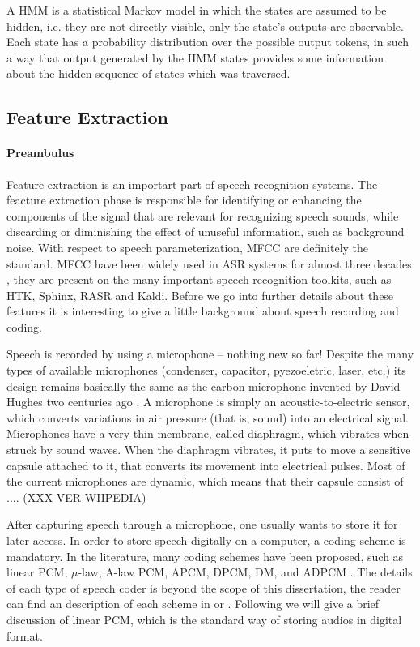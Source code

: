 A \ac{HMM} is a statistical Markov model in which the states are assumed to be hidden, i.e. they are
not directly visible, only the state's outputs are observable. Each state has a probability distribution 
over the possible output tokens, in such a way that output generated by the HMM states provides some information
about the hidden sequence of states which was traversed.

\subsection{Feature Extraction}

\paragraph{Preambulus}
Feature extraction is an importart part of speech recognition systems. The feacture extraction 
phase is responsible for identifying or enhancing the components of the signal that are relevant 
for recognizing speech sounds, while discarding or diminishing the effect of unuseful information, 
such as background noise. With respect to speech parameterization, \ac{MFCC} are definitely the
standard. \ac{MFCC} have been widely used in \ac{ASR} systems for almost three decades \cite{Davis1980}, 
they are present on the many important speech recognition toolkits, such as \ac{HTK}, Sphinx, \ac{RASR} and Kaldi.
Before we go into further details about these features it is interesting to give a little background 
about speech recording and coding.

Speech is recorded by using a microphone -- nothing new so far!
Despite the many types of available microphones (condenser, capacitor, pyezoeletric, laser, etc.) its design
remains basically the same as the carbon microphone invented by David Hughes two centuries ago \cite{Robjohns2010}.
A microphone is simply an acoustic-to-electric sensor, which converts variations in air pressure (that is, sound)
into an electrical signal. Microphones have a very thin membrane, called diaphragm, which vibrates when struck by 
sound waves.  When the diaphragm vibrates, it puts to move a sensitive capsule attached to it, 
that converts its movement into electrical pulses. Most of the current microphones are dynamic, which means 
that their capsule consist of  .... (XXX VER WIIPEDIA)

After capturing speech through a microphone, one usually wants to store it for later access. In order
to store speech digitally on a computer, a coding scheme is mandatory. In the literature, many coding schemes have
been proposed, such as linear PCM, $\mu$-law, A-law PCM, APCM, DPCM, DM, and ADPCM \cite{Huang2001}. The details of 
each type of speech coder is beyond the scope of this dissertation, the reader can 
find an description of each scheme in \citet{Huang2001} \citep{Huang2001} or \citet{Furui2001} \citep{Furui2001}. 
Following we will give a brief discussion of linear PCM, which is the standard way of storing audios in digital format. 

